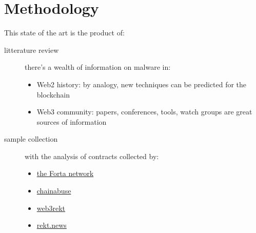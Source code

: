 \section{Methodology} \label{sec:methodology}

This state of the art is the product of:

\begin{description}
\item[litterature review]{there's a wealth of information on malware in:
    \begin{itemize}
    \item{Web2 history: by analogy, new techniques can be predicted for the blockchain}
    \item{Web3 community: papers, conferences, tools, watch groups are great sources of information}
    \end{itemize}}
\item[sample collection]{with the analysis of contracts collected by:
    \begin{itemize}
    \item{\href{https://explorer.forta.network/}{the Forta network}}
    \item{\href{https://www.chainabuse.com/reports}{chainabuse}}
    \item{\href{https://www.web3rekt.com/}{web3rekt}}
    \item{\href{https://rekt.news/}{rekt.news}}
    \end{itemize}}
\end{description}
